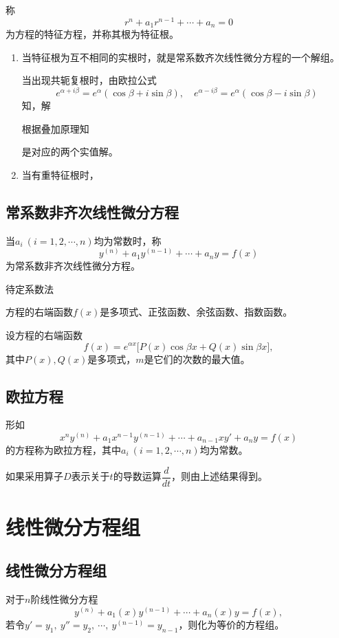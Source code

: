 称
\[
r^n+a_1r^{n-1}+\cdots+a_n=0
\]
为方程的特征方程，并称其根为特征根。

\begin{enumerate}
    \item 当特征根为互不相同的实根时，就是常系数齐次线性微分方程的一个解组。

当出现共轭复根时，由欧拉公式
\[
e^{\alpha+i\beta}=e^\alpha(\cos\beta+i\sin\beta),\quad e^{\alpha-i\beta}=e^\alpha(\cos\beta-i\sin\beta)
\]
知，解

根据叠加原理知

是对应的两个实值解。

    \item 当有重特征根时，
\end{enumerate}

\subsection{常系数非齐次线性微分方程}

当$a_i\ (i=1,2,\cdots,n)$均为常数时，称
\[
y^{(n)}+a_1y^{(n-1)}+\cdots+a_ny=f(x)
\]
为常系数非齐次线性微分方程。

\noindent 待定系数法

方程的右端函数$f(x)$是多项式、正弦函数、余弦函数、指数函数。

设方程的右端函数
\[
f(x)=e^{\alpha x}\bigl[P(x)\cos \beta x+Q(x)\sin \beta x\bigr],
\]
其中$P(x),Q(x)$是多项式，$m$是它们的次数的最大值。

\subsection{欧拉方程}

形如
\[
x^ny^{(n)}+a_1x^{n-1}y^{(n-1)}+\cdots+a_{n-1}xy'+a_ny=f(x)
\]
的方程称为欧拉方程，其中$a_i\ (i=1,2,\cdots,n)$均为常数。

如果采用算子$D$表示关于$t$的导数运算$\dfrac{d}{dt}$，则由上述结果得到。

\section{线性微分方程组}
\subsection{线性微分方程组}

对于$n$阶线性微分方程
\[
y^{(n)}+a_1(x)y^{(n-1)}+\cdots+a_n(x)y=f(x),
\]
若令$y'=y_1,\ y''=y_2,\ \cdots,\ y^{(n-1)}=y_{n-1}$，则化为等价的方程组。

